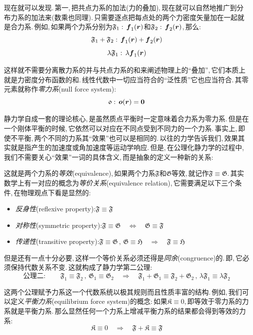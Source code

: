 现在就可以发现.\,第一,\,把共点力系的加法(力的叠加),\,现在就可以自然地推广到分布力系的加法来(数乘也同理).\,只需要逐点把每点处的两个力密度矢量加在一起就是合力系.\,例如,\,如果两个力系分别为$\mathfrak{F}_1:\,\boldsymbol{f}_1(\boldsymbol{r})$和$\mathfrak{F}_2:\,\boldsymbol{f}_2(\boldsymbol{r})$,\,那么:
\[\mathfrak{F}_1+\mathfrak{F}_2:\,\boldsymbol{f}_1(\boldsymbol{r})+\boldsymbol{f}_2(\boldsymbol{r})\]
\[\lambda \mathfrak{F}_1:\,\lambda \boldsymbol{f}_1(\boldsymbol{r})\]

这样就不需要分离散力系的并与共点力系的和来阐述物理上的``叠加'',\,它们本质上就是力密度分布函数的和.\,线性代数中一切应当符合的``泛性质''它也应当符合.\,其零元素就称作\emph{零力系}(null force system):
\[\mathfrak{0}:\,\boldsymbol{o}(\boldsymbol{r})=\boldsymbol{0}\]

静力学自成一套的理论核心,\,是虽然质点平衡时一定意味着合力系为零力系.\,但是在一个刚体平衡的时候,\,它依然可以对应在不同点受到不同力的一个力系.\,事实上,\,即使不平衡,\,两个不同的力系其``效果''也可以是相同的.\,以往的力学告诉我们,\,效果其实就是指产生的加速度或角加速度等运动学响应.\,但是,\,在公理化静力学的过程中,\,我们不需要关心``效果''一词的具体含义,\,而是抽象的定义一种新的关系:

这就是两个力系的\emph{等效}(equivalence),\,如果两个力系$\mathfrak{F}$和$\mathfrak{G}$等效,\,就记作$\mathfrak{F}\equiv\mathfrak{G}$.\,其实数学上有一对应的概念为\emph{等价关系}(equivalence relation),\,它需要满足以下三个条件,\,在物理观点下看是显然的:
\begin{itemize}
	\item \emph{反身性}(reflexive property):\qquad$\mathfrak{F}\equiv\mathfrak{F}$
	\item \emph{对称性}(symmetric property):\qquad$\mathfrak{F}\equiv\mathfrak{G}\quad \Leftrightarrow\quad\mathfrak{G}\equiv\mathfrak{F} $
	\item \emph{传递性}(transitive property):\qquad$\mathfrak{F}\equiv\mathfrak{G}\,,\,\mathfrak{G}\equiv\mathfrak{H}\quad \Rightarrow\quad\mathfrak{F}\equiv\mathfrak{H} $
\end{itemize}

但是还有一点十分必要,\,这样一个等价关系必须还得是\emph{同余}(congruence)的.\,即,\,它必须保持代数关系不变.\,这就构成了静力学第二公理:
\[\text{公理二}:\qquad \mathfrak{F}_1\equiv\mathfrak{F}_2\,,\,\mathfrak{G}_1\equiv\mathfrak{G}_2\quad \Rightarrow \quad \mathfrak{F}_1+\mathfrak{G}_1\equiv\mathfrak{F}_2+\mathfrak{G}_2\,,\,\lambda\mathfrak{F}_1\equiv\lambda\mathfrak{F}_2\]

这两个公理赋予力系这一个代数系统以极其规则而且性质丰富的结构.\,例如,\,我们可以定义\emph{平衡力系}(equilibrium force system)的概念:\,如果$\mathfrak{K}\equiv \mathfrak{0}$,\,即等效于零力系的力系就是平衡力系.\,那么显然任何一个力系上增减平衡力系的结果都会得到等效的力系:
\[\mathfrak{K}\equiv \mathfrak{0}\quad \Rightarrow \quad \mathfrak{F}+\mathfrak{K}\equiv \mathfrak{F}\]


